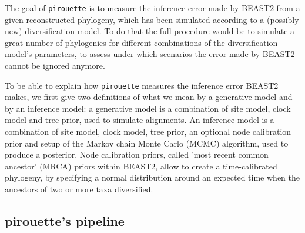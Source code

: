 \documentclass{article}
\begin{document}

The goal of \verb;pirouette; is to measure the inference error made by BEAST2 from a given reconstructed phylogeny, which has been simulated according to a (possibly new) diversification model.
To do that the full procedure would be to simulate a great number of phylogenies for different combinations of the diversification model's parameters, to assess under which scenarios the error made by BEAST2 cannot be ignored anymore. 

To be able to explain how \verb;pirouette; measures the inference error
BEAST2 makes, we first give two definitions of what
we mean by a generative model and by an inference model: 
a generative model is a combination of site model, clock model and tree prior,
used to simulate alignments. An inference model is a combination of 
site model, clock model, tree prior, an optional node calibration prior
and setup of the Markov chain Monte Carlo (MCMC) algorithm, 
used to produce a posterior. Node calibration priors, called 'most
recent common ancestor' (MRCA) priors within BEAST2, allow to create a time-calibrated phylogeny, by specifying a normal distribution around an expected time when the ancestors of two or more taxa diversified. 

\subsection{pirouette's pipeline}
\end{document}
